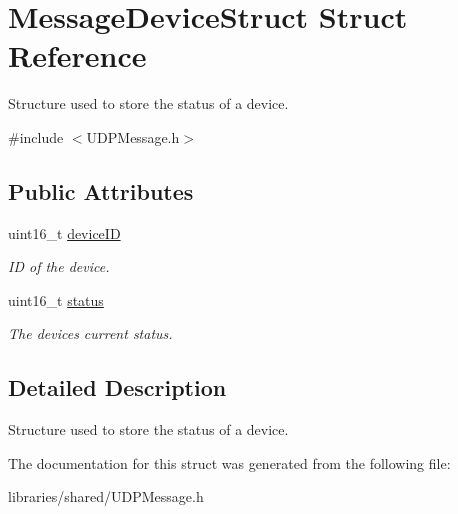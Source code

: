 \hypertarget{struct_message_device_struct}{}\section{Message\+Device\+Struct Struct Reference}
\label{struct_message_device_struct}


Structure used to store the status of a device.  




{\ttfamily \#include $<$U\+D\+P\+Message.\+h$>$}

\subsection*{Public Attributes}
\begin{DoxyCompactItemize}
\item 
\mbox{\label{struct_message_device_struct_ae5ccd8d28603969d44f8a4d637ffd1f3}} 
uint16\+\_\+t \hyperlink{struct_message_device_struct_ae5ccd8d28603969d44f8a4d637ffd1f3}{device\+ID}
\begin{DoxyCompactList}\small\item\em ID of the device. \end{DoxyCompactList}\item 
\mbox{\label{struct_message_device_struct_a4be474328dd0ebf49d5d409359f20df4}} 
uint16\+\_\+t \hyperlink{struct_message_device_struct_a4be474328dd0ebf49d5d409359f20df4}{status}
\begin{DoxyCompactList}\small\item\em The device\textquotesingle{}s current status. \end{DoxyCompactList}\end{DoxyCompactItemize}


\subsection{Detailed Description}
Structure used to store the status of a device. 

The documentation for this struct was generated from the following file\+:\begin{DoxyCompactItemize}
\item 
libraries/shared/U\+D\+P\+Message.\+h\end{DoxyCompactItemize}
